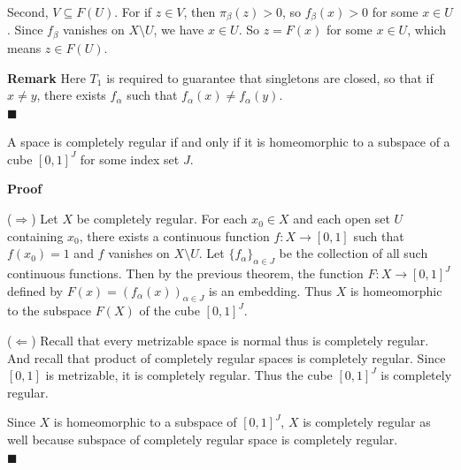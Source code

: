 \documentclass[main.tex]{subfiles}
\begin{document}
Second, $V \subseteq F(U)$. For if $z \in V$, then $\pi_{\beta}(z) > 0$, so $f_{\beta}(x) > 0$ for some $x \in U$. Since $f_{\beta}$ vanishes on $X \setminus U$, we have $x \in U$. So $z = F(x)$ for some $x \in U$, which means $z \in F(U)$. 
\par \noindent \textbf{Remark} Here $T_1$ is required to guarantee that singletons are closed, so that if $x \neq y$, there exists $f_{\alpha}$ such that $f_{\alpha}(x) \neq f_{\alpha}(y)$. 
\mbox{} \\ \null \hfill $\blacksquare$ 
\begin{theorem}\label{thm:CRImbed}
    A space is completely regular if and only if it is homeomorphic to a subspace of a cube $[0, 1]^J$ for some index set $J$. 
\end{theorem}
\par \noindent \textbf{Proof} 
\par ($\Rightarrow$) Let $X$ be completely regular. For each $x_0 \in X$ and each open set $U$ containing $x_0$, there exists a continuous function $f: X \to [0, 1]$ such that $f(x_0) = 1$ and $f$ vanishes on $X \setminus U$. Let $\{f_{\alpha}\}_{\alpha \in J}$ be the collection of all such continuous functions. Then by the previous theorem, the function $F: X \to [0, 1]^J$ defined by $F(x) = (f_{\alpha}(x))_{\alpha \in J}$ is an embedding. Thus $X$ is homeomorphic to the subspace $F(X)$ of the cube $[0, 1]^J$. 
\par ($\Leftarrow$) Recall that every metrizable space is normal thus is completely regular. And recall that product of completely regular spaces is completely regular. Since $[0, 1]$ is metrizable, it is completely regular. Thus the cube $[0, 1]^J$ is completely regular. 
\par Since $X$ is homeomorphic to a subspace of $[0, 1]^J$, $X$ is completely regular as well because subspace of completely regular space is completely regular. 
\mbox{} \\ \null \hfill $\blacksquare$ 
\end{document}
